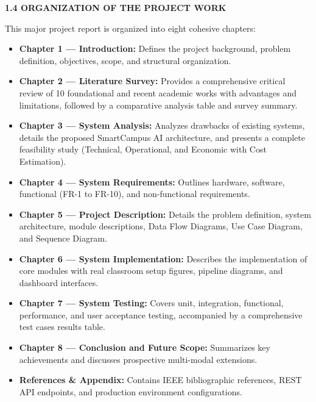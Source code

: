 \vspace{0.2in}
\begin{flushleft}
{\fontsize{14pt}{18pt}\selectfont \textbf{1.4 ORGANIZATION OF THE PROJECT WORK}}\\[2mm]
\end{flushleft}

\noindent This major project report is organized into eight cohesive chapters:
\begin{itemize}
    \item \textbf{Chapter 1 — Introduction:} Defines the project background, problem definition, objectives, scope, and structural organization.
    \item \textbf{Chapter 2 — Literature Survey:} Provides a comprehensive critical review of 10 foundational and recent academic works with advantages and limitations, followed by a comparative analysis table and survey summary.
    \item \textbf{Chapter 3 — System Analysis:} Analyzes drawbacks of existing systems, details the proposed SmartCampus AI architecture, and presents a complete feasibility study (Technical, Operational, and Economic with Cost Estimation).
    \item \textbf{Chapter 4 — System Requirements:} Outlines hardware, software, functional (FR-1 to FR-10), and non-functional requirements.
    \item \textbf{Chapter 5 — Project Description:} Details the problem definition, system architecture, module descriptions, Data Flow Diagrams, Use Case Diagram, and Sequence Diagram.
    \item \textbf{Chapter 6 — System Implementation:} Describes the implementation of core modules with real classroom setup figures, pipeline diagrams, and dashboard interfaces.
    \item \textbf{Chapter 7 — System Testing:} Covers unit, integration, functional, performance, and user acceptance testing, accompanied by a comprehensive test cases results table.
    \item \textbf{Chapter 8 — Conclusion and Future Scope:} Summarizes key achievements and discusses prospective multi-modal extensions.
    \item \textbf{References \& Appendix:} Contains IEEE bibliographic references, REST API endpoints, and production environment configurations.
\end{itemize}
\newpage
